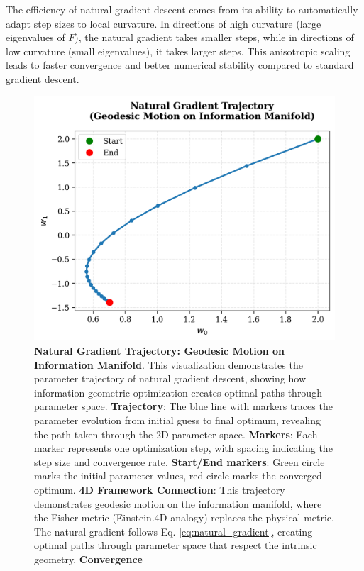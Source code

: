 \documentclass[
  10pt,
]{article}
\begin{document}
The efficiency of natural gradient descent comes from its ability to
automatically adapt step sizes to local curvature. In directions of high
curvature (large eigenvalues of \(F\)), the natural gradient takes
smaller steps, while in directions of low curvature (small eigenvalues),
it takes larger steps. This anisotropic scaling leads to faster
convergence and better numerical stability compared to standard gradient
descent.

\begin{figure}
\centering
\includegraphics{../output/figures/natural_gradient_path.png}
\caption{\textbf{Natural Gradient Trajectory: Geodesic Motion on
Information Manifold}. This visualization demonstrates the parameter
trajectory of natural gradient descent, showing how
information-geometric optimization creates optimal paths through
parameter space. \textbf{Trajectory}: The blue line with markers traces
the parameter evolution from initial guess to final optimum, revealing
the path taken through the 2D parameter space. \textbf{Markers}: Each
marker represents one optimization step, with spacing indicating the
step size and convergence rate. \textbf{Start/End markers}: Green circle
marks the initial parameter values, red circle marks the converged
optimum. \textbf{4D Framework Connection}: This trajectory demonstrates
geodesic motion on the information manifold, where the Fisher metric
(Einstein.4D analogy) replaces the physical metric. The natural gradient
follows Eq. \eqref{eq:natural_gradient}, creating optimal paths through
parameter space that respect the intrinsic geometry. \textbf{Convergence
}}
\end{figure}
\end{document}
